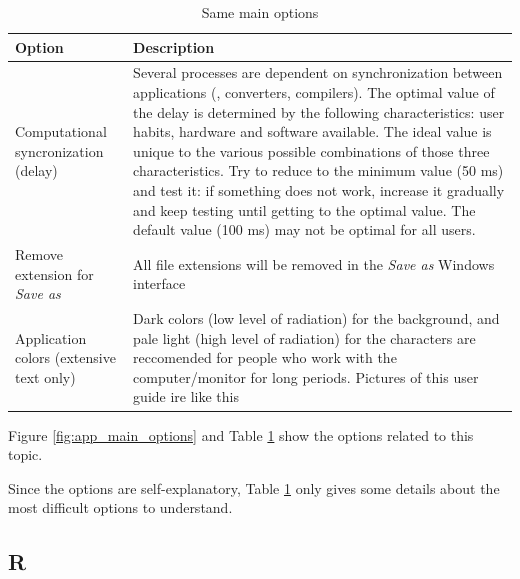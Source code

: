 \begin{table}
  \begin{footnotesize}
    \begin{tabularx}{\headwidth}{>{\hsize=0.35\hsize}X>{\hsize=0.65\hsize}X}\\
      \hline
      \textbf{Option} & \textbf{Description} \\
      \hline
      Computational syncronization (delay) & Several processes are dependent on synchronization between applications
       (\RR{}, converters, compilers). The optimal value of the delay is determined by the following characteristics:
       user habits, hardware and software available.
       The ideal value is unique to the various possible combinations of those three characteristics.
       Try to reduce to the minimum value (50 ms) and test it: if something does not work, increase it gradually
       and keep testing until getting to the optimal value. The default value (100 ms) may not be optimal for all users. \\
      Remove extension for \textit{Save as} & All file extensions will be removed
       in the \textit{Save as} Windows interface \\
      Application colors (extensive text only) & Dark colors (low level of radiation)
       for the background, and pale light (high level of radiation) for the characters
       are reccomended for people who work with the computer/monitor for long periods.
       Pictures of this user guide ire like this \\
      \hline
    \end{tabularx}
  \end{footnotesize}
  \caption{Same main options}
  \label{tab:app_main}
\end{table}

Figure \ref{fig:app_main_options} and
Table \ref{tab:app_main}
show the options related to this topic.

Since the options are self-explanatory, Table \ref{tab:app_main} only gives some
details about the most difficult options to understand.


\hypertarget{working_app_r}{}
\subsection{R}

